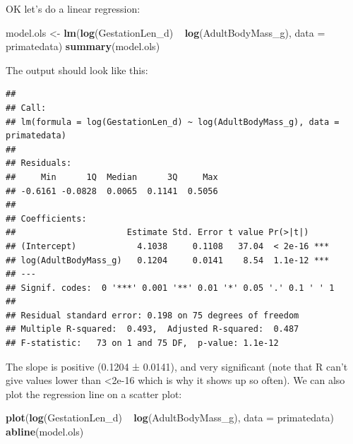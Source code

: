 \documentclass[12pt]{article}
\newcommand{\KeywordTok}[1]{\textcolor[rgb]{0.13,0.29,0.53}{\textbf{{#1}}}}
\newcommand{\DataTypeTok}[1]{\textcolor[rgb]{0.13,0.29,0.53}{{#1}}}
\newcommand{\StringTok}[1]{\textcolor[rgb]{0.31,0.60,0.02}{{#1}}}
\newcommand{\NormalTok}[1]{{#1}}
\begin{document}
OK let's do a linear regression:

\begin{snugshade}
\begin{Highlighting}[]
\NormalTok{model.ols <-}\StringTok{ }\KeywordTok{lm}\NormalTok{(}\KeywordTok{log}\NormalTok{(GestationLen_d) ~}\StringTok{ }\KeywordTok{log}\NormalTok{(AdultBodyMass_g), }
      \DataTypeTok{data =} \NormalTok{primatedata)}
\KeywordTok{summary}\NormalTok{(model.ols)}
\end{Highlighting}
\end{snugshade}

The output should look like this: 

\begin{verbatim}
## 
## Call:
## lm(formula = log(GestationLen_d) ~ log(AdultBodyMass_g), data = primatedata)
## 
## Residuals:
##     Min      1Q  Median      3Q     Max 
## -0.6161 -0.0828  0.0065  0.1141  0.5056 
## 
## Coefficients:
##                      Estimate Std. Error t value Pr(>|t|)    
## (Intercept)            4.1038     0.1108   37.04  < 2e-16 ***
## log(AdultBodyMass_g)   0.1204     0.0141    8.54  1.1e-12 ***
## ---
## Signif. codes:  0 '***' 0.001 '**' 0.01 '*' 0.05 '.' 0.1 ' ' 1
## 
## Residual standard error: 0.198 on 75 degrees of freedom
## Multiple R-squared:  0.493,  Adjusted R-squared:  0.487 
## F-statistic:   73 on 1 and 75 DF,  p-value: 1.1e-12
\end{verbatim}

The slope is positive (0.1204 ± 0.0141), and very significant (note that R can’t give values lower than <2e-16 which is why it shows up so often). We can also plot the regression line on a scatter plot:

\begin{snugshade}
\begin{Highlighting}[]
\KeywordTok{plot}\NormalTok{(}\KeywordTok{log}\NormalTok{(GestationLen_d) ~}\StringTok{ }\KeywordTok{log}\NormalTok{(AdultBodyMass_g), }\DataTypeTok{data =} \NormalTok{primatedata)}
\KeywordTok{abline}\NormalTok{(model.ols)}
\end{Highlighting}
\end{snugshade}
\end{document}
